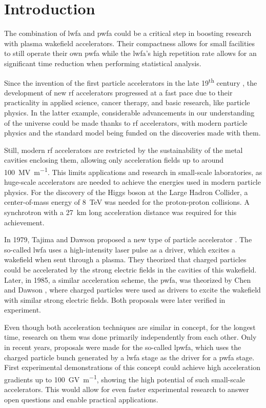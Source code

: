 \documentclass[bachelor_thesis]{subfiles}
\begin{document}
\chapter{Introduction}
The combination of \gls{lwfa} and \gls{pwfa} could be a critical step in boosting research with plasma wakefield accelerators.
Their compactness allows for small facilities to still operate their own \gls{pwfa} while the \gls{lwfa}'s high repetition rate allows for an significant time reduction when performing statistical analysis. 

Since the invention of the first particle accelerators in the late 19\textsuperscript{th} century \cite{Malka2016}, the development of new \gls{rf} accelerators progressed at a fast pace
due to their practicality in applied science, cancer therapy, and basic research, like particle physics. In the latter example, considerable advancements in our understanding of the universe
could be made thanks to \gls{rf} accelerators, with modern particle physics and the standard model being funded on the discoveries made with them.

Still, modern \gls{rf} accelerators are restricted by the sustainability of the metal cavities enclosing them, allowing only acceleration fields up to around \qty{100}{\mega\volt\per\m}.
This limits applications and research in small-scale laboratories, as huge-scale accelerators are needed to achieve the energies used in modern particle physics.
For the discovery of the Higgs boson at the Large Hadron Collider, a center-of-mass energy of \qty{8}{\TeV} \cite{Aad2012} was needed for the proton-proton collisions.
A synchrotron with a \qty{27}{\km} long acceleration distance was required for this achievement.

In 1979, Tajima and Dawson proposed a new type of particle accelerator \cite{Tajima1979}. The so-called \acrlong{lwfa} uses a high-intensity laser pulse as a driver, which excites a wakefield
when sent through a plasma. They theorized that charged particles could be accelerated by the strong electric fields in the cavities of this wakefield.
Later, in 1985, a similar acceleration scheme, the \acrlong{pwfa}, was theorized by Chen and Dawson \cite{Chen1985}, where charged particles were used as drivers to excite the wakefield with similar strong electric fields.
Both proposals were later verified in experiment. 

Even though both acceleration techniques are similar in concept, for the longest time, research on them was done primarily independently from each other. Only in recent years, 
proposals \cite{Ossa2019} were made for the so-called \gls{lpwfa}, which uses the charged particle bunch generated by a \gls{lwfa} stage as the driver for a \gls{pwfa} stage.
First experimental demonstrations of this concept \cite{Kurz2021} could achieve high acceleration gradients up to \qty{100}{\giga\volt\per\m}, showing the high potential of
such small-scale accelerators. This would allow for even faster experimental research to answer open questions and enable practical applications.
\end{document}
